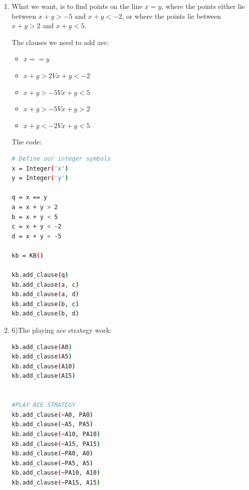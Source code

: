 \documentclass[a4paper,11pt]{article}
\begin{document}
\begin{enumerate}
The three constraints per model: \\\\
(a) This model already has three constraints. \\
(b) Only the last clause has to change, namely to $[x + y >=5] $= True\\
(c) Only the second clause has to change, namely to$ [x + y <= 2]$ = True.\\

Now we end up with this:
\begin{lstlisting}[language=bash]
(a) [x = y] = True, [x + y > 2] = True, [x + y < 5] = True
(b) [x = y] = True, [x + y > 2] = True, [x + y >= 5] = True
(c) [x = y] = True, [x + y <= 2] = True, [x + y < 5] = True
\end{lstlisting}

\item What we want, is to find points on the line $x = y$, where the points either lie between $x + y > -5$ and $x + y < -2$, or where the points lie between $x + y > 2$ and $x + y < 5$.

The clauses we need to add are:
\begin{itemize}
\item $x == y$
\item $x + y > 2 V  x + y < -2$
\item $x + y > -5 V  x + y < 5$
\item $x + y > - 5 V  x + y > 2$
\item $x + y < -2 V  x + y < 5$
\end{itemize}

The code:
\begin{lstlisting}[language=bash]
# Define our integer symbols
x = Integer('x')
y = Integer('y')

q = x == y
a = x + y > 2
b = x + y < 5
c = x + y < -2
d = x + y > -5

kb = KB()

kb.add_clause(q)
kb.add_clause(a, c)
kb.add_clause(a, d)
kb.add_clause(b, c)
kb.add_clause(b, d)
\end{lstlisting}

\item 6)The playing ace strategy work:

\begin{lstlisting}[language=bash]
kb.add_clause(A0)
kb.add_clause(A5)
kb.add_clause(A10)
kb.add_clause(A15)


#PLAY ACE STRATEGY
kb.add_clause(~A0, PA0)
kb.add_clause(~A5, PA5)
kb.add_clause(~A10, PA10)
kb.add_clause(~A15, PA15)
kb.add_clause(~PA0, A0)
kb.add_clause(~PA5, A5)
kb.add_clause(~PA10, A10)
kb.add_clause(~PA15, A15)
\end{lstlisting}


\end{enumerate}
\end{document}
